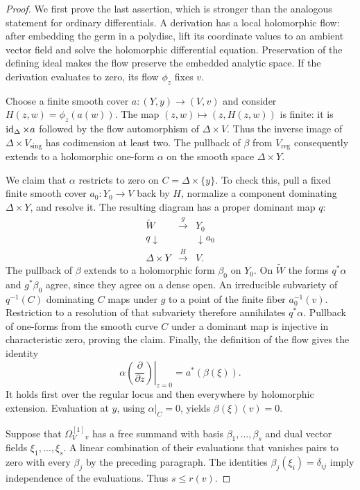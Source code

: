 \begin{proof}
We first prove the last assertion, which is stronger than the analogous
statement for ordinary differentials.  A derivation has a local holomorphic
flow: after embedding the germ in a polydisc, lift its coordinate values to
an ambient vector field and solve the holomorphic differential equation.
Preservation of the defining ideal makes the flow preserve the embedded
analytic space.  If the derivation evaluates to zero, its flow $\phi_z$
fixes $v$.

Choose a finite smooth cover $a:(Y,y)\to(V,v)$ and consider
$H(z,w)=\phi_z(a(w))$.  The map $(z,w)\mapsto(z,H(z,w))$ is finite:
it is $\operatorname{id}_\Delta\times a$ followed by the flow automorphism of
$\Delta\times V$.  Thus the inverse image of $\Delta\times V_{\mathrm{sing}}$
has codimension at least two.  The pullback of $\beta$ from
$V_{\mathrm{reg}}$ consequently extends to a holomorphic one-form
$\alpha$ on the smooth space $\Delta\times Y$.

We claim that $\alpha$ restricts to zero on $C=\Delta\times\{y\}$.
To check this, pull a fixed finite smooth cover $a_0:Y_0\to V$ back by
$H$, normalize a component dominating $\Delta\times Y$, and resolve it.
The resulting diagram has a proper dominant map $q$:
\[
 \begin{array}{ccc}
 \widetilde W&\xrightarrow{\ g\ }&Y_0\\
 {\scriptstyle q}\downarrow&&\downarrow{\scriptstyle a_0}\\
 \Delta\times Y&\xrightarrow{\ H\ }&V.
 \end{array}
\]
The pullback of $\beta$ extends to a holomorphic form $\beta_0$ on
$Y_0$.  On $\widetilde W$ the forms $q^*\alpha$ and $g^*\beta_0$
agree, since they agree on a dense open.  An irreducible subvariety of
$q^{-1}(C)$ dominating $C$ maps under $g$ to a point of the finite fiber
$a_0^{-1}(v)$.  Restriction to a resolution of that subvariety therefore
annihilates $q^*\alpha$.  Pullback of one-forms from the smooth curve
$C$ under a dominant map is injective in characteristic zero, proving
the claim.  Finally, the definition of the flow gives the identity
\[
 \left.\alpha\left(\frac{\partial}{\partial z}\right)\right|_{z=0}
       =a^*(\beta(\xi)).
\]
It holds first over the regular locus and then everywhere by holomorphic
extension.  Evaluation at $y$, using $\alpha|_C=0$, yields
$\beta(\xi)(v)=0$.

Suppose that $\Omega_V^{[1]}{}_v$ has a free summand with basis
$\beta_1,\ldots,\beta_s$ and dual vector fields
$\xi_1,\ldots,\xi_s$.  A linear combination of their evaluations that
vanishes pairs to zero with every $\beta_j$ by the preceding paragraph.
The identities $\beta_j(\xi_i)=\delta_{ij}$ imply independence of the
evaluations.  Thus $s\leq r(v)$.


\end{proof}
